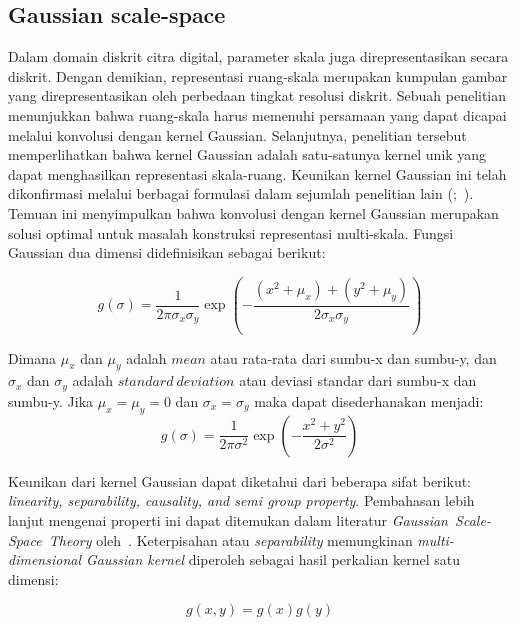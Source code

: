 \subsection{Gaussian scale-space}

Dalam domain diskrit citra digital, parameter skala juga direpresentasikan secara diskrit. 
Dengan demikian, representasi ruang-skala merupakan kumpulan gambar yang direpresentasikan oleh perbedaan tingkat resolusi diskrit. 
Sebuah penelitian menunjukkan bahwa ruang-skala harus memenuhi persamaan yang dapat dicapai melalui konvolusi dengan kernel Gaussian. 
Selanjutnya, penelitian tersebut memperlihatkan bahwa kernel Gaussian adalah satu-satunya kernel unik yang dapat menghasilkan representasi skala-ruang. 
Keunikan kernel Gaussian ini telah dikonfirmasi melalui berbagai formulasi dalam sejumlah penelitian lain (\cite[hlm. 92--93]{Lowe2004};~\cite[hlm. 13--15]{mikolajczyk:tel-00584096}). 
Temuan ini menyimpulkan bahwa konvolusi dengan kernel Gaussian merupakan solusi optimal untuk masalah konstruksi representasi multi-skala. Fungsi Gaussian dua dimensi didefinisikan sebagai berikut:

\begin{equation*}
g(\sigma) = \frac{1}{2\pi\sigma_{x}\sigma_{y}}\exp\left(-\frac{(x^2+\mu_{x})+(y^2+\mu_{y})}{2\sigma_{x}\sigma_{y}}\right)
\end{equation*}

Dimana \(\mu_{x}\) dan \(\mu_{y}\) adalah \(mean\) atau rata-rata dari sumbu-x dan sumbu-y, dan \(\sigma_{x}\) dan \(\sigma_{y}\) adalah \(standard~deviation\) atau deviasi standar dari sumbu-x dan sumbu-y. Jika \(\mu_{x} = \mu_{y} = 0\) dan \(\sigma_{x} = \sigma_{y}\) maka dapat disederhanakan menjadi:
\begin{equation}
g(\sigma) = \frac{1}{2\pi\sigma^2}\exp\left(-\frac{x^2+y^2}{2\sigma^2}\right)
\label{eq:gaussian kernel}
\end{equation}

Keunikan dari kernel Gaussian dapat diketahui dari beberapa sifat berikut: 
\emph{linearity, separability, causality, and semi group property}. Pembahasan lebih lanjut mengenai properti ini dapat ditemukan dalam literatur \emph{Gaussian~Scale-Space~Theory} oleh~\cite{Sporring1997}. Keterpisahan 
atau \emph{separability} memungkinan \emph{multi-dimensional Gaussian kernel} diperoleh sebagai hasil perkalian kernel satu dimensi:

\begin{equation*}
  g(x,y) = g(x)g(y)
\end{equation*}

